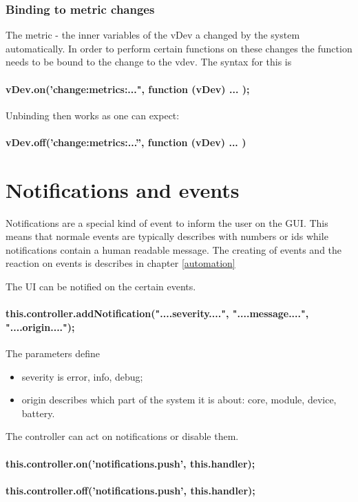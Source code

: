 \subsubsection{Binding to metric changes}

The metric - the inner variables of the vDev a changed by the system automatically.
In order to perform certain functions on these changes the function needs to be 
bound to the change to the vdev. The syntax for this is

\paragraph{vDev.on('change:metrics:...", function (vDev) { ... });}

Unbinding then works as one can expect:

\paragraph{vDev.off(’change:metrics:...”, function (vDev) ... )} 


\section{Notifications and events}

Notifications are a special 
kind of event to inform the user on the GUI. This means that normale events are typically
describes with numbers or ids while notifications contain a human readable message. 
The creating of events and the reaction on events is describes in chapter \ref{automation}
 
The UI can be notified on the certain events.

\paragraph{this.controller.addNotification("....severity....", "....message....", "....origin....");} 

The parameters define
\begin{itemize}
\item severity is error, info, debug; 
\item origin describes which part of the system it is about: core, module, device, battery.
\end{itemize}

The controller can act on  notifications or disable them.

\paragraph{this.controller.on('notifications.push', this.handler);}
\paragraph{this.controller.off('notifications.push', this.handler);}



 


 

